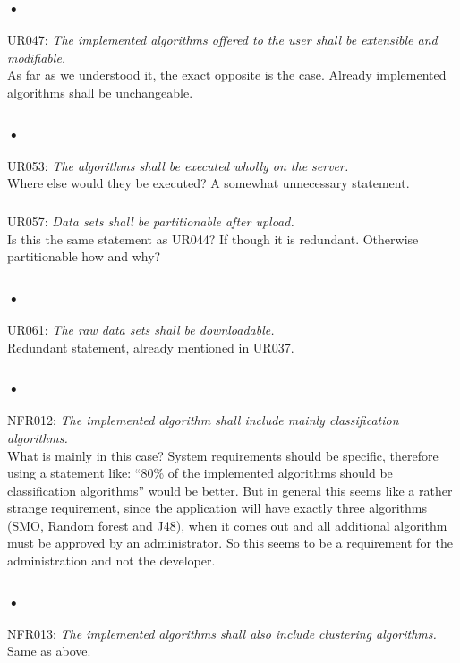 \documentclass{article}
\begin{document}
\subsubsection{•}
UR047: \textit{The implemented algorithms offered to the user shall be extensible and modifiable.}\\
As far as we understood it, the exact opposite is the case. Already implemented algorithms shall be unchangeable.

\subsubsection{•}
UR053: \textit{The algorithms shall be executed wholly on the server.}\\
Where else would they be executed? A somewhat unnecessary statement.

\subsubsection{}
UR057: \textit{Data sets shall be partitionable after upload.}\\
Is this the same statement as UR044? If though it is redundant. Otherwise partitionable how and why?

\subsubsection{•}
UR061: \textit{The raw data sets shall be downloadable.}\\
Redundant statement, already mentioned in UR037.

\subsubsection{•}
NFR012: \textit{The implemented algorithm shall include mainly classification algorithms.}\\
What is mainly in this case? System requirements should be specific, therefore using a statement like: “80\% of the implemented algorithms should be classification algorithms” would be better. But in general this seems like a rather strange requirement, since the application will have exactly three algorithms (SMO, Random forest and J48), when it comes out and all additional algorithm must be approved by an administrator. So this seems to be a requirement for the administration and not the developer.

\subsubsection{•}
NFR013: \textit{The implemented algorithms shall also include clustering algorithms.}\\
Same as above.
\end{document}
